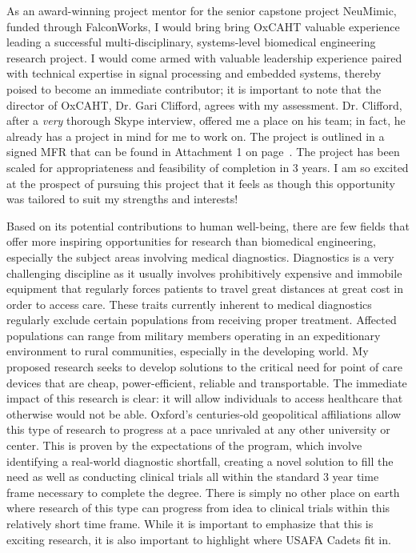 \documentclass{article}
\begin{document}
As an award-winning project mentor for the senior capstone project
NeuMimic, funded through FalconWorks, I would bring bring OxCAHT valuable experience leading a
successful multi-disciplinary, systems-level biomedical engineering research project. I would 
come armed with valuable leadership experience paired with technical expertise in signal 
processing and embedded systems, thereby poised to become an immediate contributor;
it is important to note that the director of OxCAHT, Dr. Gari Clifford, agrees
with my assessment. Dr. Clifford, after a \emph{very} thorough Skype interview,
offered me a place on his team; in fact, he already has a project in mind for me to work on. 
The project is outlined in a signed MFR that can be found in Attachment 1
on page~\pageref{sec:prop}. The project has been scaled for appropriateness and feasibility of
completion in 3 years. I am so excited at the prospect of pursuing this project that it feels as though this opportunity was tailored to suit my strengths and interests! 
 
Based on its potential contributions to human well-being, there are few fields
that offer more inspiring opportunities for research than biomedical engineering, especially the subject areas involving medical diagnostics.
Diagnostics is a very challenging discipline as it usually involves
prohibitively expensive and immobile equipment that regularly forces patients
to travel great distances at great cost in order to access care. These traits
currently inherent to medical diagnostics regularly exclude certain
populations from receiving proper
treatment. Affected populations can range from military members operating in an
expeditionary environment to rural communities, especially in the developing
world. My proposed research seeks to develop solutions to the critical need for
point of care devices that are cheap, power-efficient, reliable and
transportable. The immediate impact of this research is clear: it will allow
individuals to access healthcare that otherwise would not be able. Oxford's
centuries-old geopolitical affiliations allow this type of research to progress 
at a pace unrivaled at any other university or center. This is proven by the
expectations of the program, which involve identifying a real-world diagnostic 
shortfall, creating a novel solution to fill the need as well as conducting
clinical trials all within the standard 3 year time frame necessary to 
complete the degree. There is simply no other place on earth where research of
this type can progress from idea to clinical trials within this relatively short
time frame. While it is important to emphasize that this is exciting research,
it is also important to highlight where USAFA Cadets fit in.
 
\end{document}
